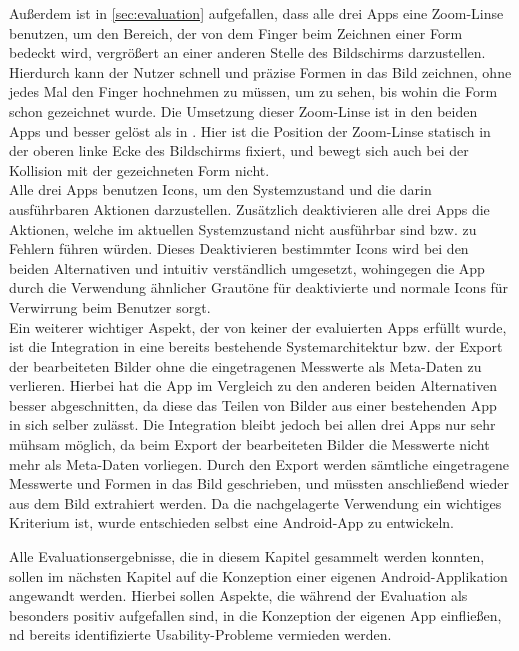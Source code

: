 Außerdem ist in \autoref{sec:evaluation} aufgefallen, dass alle drei Apps eine Zoom-Linse benutzen, um den Bereich, der von dem Finger beim Zeichnen einer Form bedeckt wird, vergrößert an einer anderen Stelle des Bildschirms darzustellen.
Hierdurch kann der Nutzer schnell und präzise Formen in das Bild zeichnen, ohne jedes Mal den Finger hochnehmen zu müssen, um zu sehen, bis wohin die Form schon gezeichnet wurde.
Die Umsetzung dieser Zoom-Linse ist in den beiden Apps \mm{} und \pm{} besser gelöst als in \im{}.
Hier ist die Position der Zoom-Linse statisch in der oberen linke Ecke des Bildschirms fixiert, und bewegt sich auch bei der Kollision mit der gezeichneten Form nicht. \\

Alle drei Apps benutzen Icons, um den Systemzustand und die darin ausführbaren Aktionen darzustellen.
Zusätzlich deaktivieren alle drei Apps die Aktionen, welche im aktuellen Systemzustand nicht ausführbar sind bzw. zu Fehlern führen würden.
Dieses Deaktivieren bestimmter Icons wird bei den beiden Alternativen \mm{} und \pm{} intuitiv verständlich umgesetzt, wohingegen die App \im{} durch die Verwendung ähnlicher Grautöne für deaktivierte und normale Icons für Verwirrung beim Benutzer sorgt. \\

Ein weiterer wichtiger Aspekt, der von keiner der evaluierten Apps erfüllt wurde, ist die Integration in eine bereits bestehende Systemarchitektur bzw. der Export der bearbeiteten Bilder ohne die eingetragenen Messwerte als Meta-Daten zu verlieren. 
Hierbei hat die App \im{} im Vergleich zu den anderen beiden Alternativen besser abgeschnitten, da diese das Teilen von Bilder aus einer bestehenden App in sich selber zulässt.
Die Integration bleibt jedoch bei allen drei Apps nur sehr mühsam möglich, da beim Export der bearbeiteten Bilder die Messwerte nicht mehr als Meta-Daten vorliegen.
Durch den Export werden sämtliche eingetragene Messwerte und Formen in das Bild geschrieben, und müssten anschließend wieder aus dem Bild extrahiert werden.
Da die nachgelagerte Verwendung ein wichtiges Kriterium ist, wurde entschieden selbst eine Android-App zu entwickeln.

Alle Evaluationsergebnisse, die in diesem Kapitel gesammelt werden konnten, sollen im nächsten Kapitel auf die Konzeption einer eigenen Android-Applikation angewandt werden.
Hierbei sollen Aspekte, die während der Evaluation als besonders positiv aufgefallen sind, in die Konzeption der eigenen App einfließen, nd bereits identifizierte Usability-Probleme vermieden werden.
